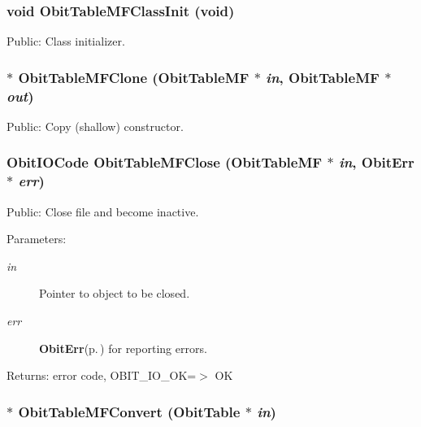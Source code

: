 \subsubsection{\setlength{\rightskip}{0pt plus 5cm}void Obit\-Table\-MFClass\-Init (void)}\label{ObitTableMF_8h_a10}


Public: Class initializer. 

\subsubsection{$\ast$ Obit\-Table\-MFClone ({\bf Obit\-Table\-MF} $\ast$ {\em in}, {\bf Obit\-Table\-MF} $\ast$ {\em out})}\label{ObitTableMF_8h_a15}


Public: Copy (shallow) constructor. 

\subsubsection{\setlength{\rightskip}{0pt plus 5cm}Obit\-IOCode Obit\-Table\-MFClose ({\bf Obit\-Table\-MF} $\ast$ {\em in}, {\bf Obit\-Err} $\ast$ {\em err})}\label{ObitTableMF_8h_a21}


Public: Close file and become inactive. 

\begin{Desc}
\item[Parameters:]
\begin{description}
\item[{\em in}]Pointer to object to be closed. \item[{\em err}]{\bf Obit\-Err}{\rm (p.\,\pageref{structObitErr})} for reporting errors. \end{description}
\end{Desc}
\begin{Desc}
\item[Returns:]error code, OBIT\_\-IO\_\-OK=$>$ OK \end{Desc}
\subsubsection{$\ast$ Obit\-Table\-MFConvert ({\bf Obit\-Table} $\ast$ {\em in})}\label{ObitTableMF_8h_a16}



